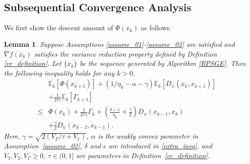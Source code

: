 \documentclass[letterpaper]{article} %
\newtheorem{lemma}{Lemma}
\begin{document}
	\subsection{Subsequential Convergence Analysis}
	We first show the descent amount of $\Phi(x_{k})$ as follows.
	\begin{lemma}\label{lemma_Phi_kk1}
		Suppose Assumptions \ref{assume_01}-\ref{assume_02} are satisfied  and  $\tilde{\nabla}f(\bar{x}_{k})$  satisfies the variance reduction property defined by Definition \ref{vr_definition}. Let $\{x_{k}\}$ be the sequence generated by Algorithm \ref{BPSGE}. Then the following inequality holds for any $k>0$, 
		\begin{align*}
			&\mathbb{E}_{k}[\Phi(x_{k+1})] +\left(1/\eta_{k}-\alpha-\gamma\right)\mathbb{E}_{k}[D_{\psi}(x_{k},x_{k+1})]\\
			&+\frac{1}{2\tau\gamma}\mathbb{E}_{k}[\Gamma_{k+1}]\\
			\le&\Phi(x_{k})+\frac{1}{2\tau\gamma}\Gamma_{k}+\left(\frac{\delta-\epsilon}{\eta_{k}}+
			\frac{\gamma}{2}\right)D_{\psi}(x_{k-1},x_{k})\\
			&+\frac{\gamma}{2}D_{\psi}(x_{k-2},x_{k-1}).
		\end{align*}
		Here,  $\gamma=\sqrt{2(V_{\Gamma}/\tau+V_{1})}$,  $\alpha$ is the weakly convex parameter in Assumption~\ref{assume_02},  $\delta$ and $\epsilon$ are introduced in \eqref{extra_ineq}, and $V_{1}, V_{2},V_{\Gamma}\ge 0$, $\tau\in(0,1]$ are parameters in Definition~\ref{vr_definition}.
	\end{lemma}
	
\end{document}
